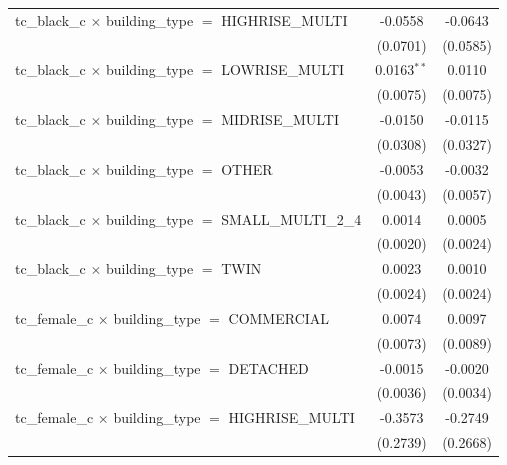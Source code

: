 \begin{tabular}{lcc}
   tc\_black\_c $\times$ building\_type $=$ HIGHRISE\_MULTI            & -0.0558                & -0.0643\\   
                                                                       & (0.0701)               & (0.0585)\\   
   tc\_black\_c $\times$ building\_type $=$ LOWRISE\_MULTI             & 0.0163$^{**}$          & 0.0110\\   
                                                                       & (0.0075)               & (0.0075)\\   
   tc\_black\_c $\times$ building\_type $=$ MIDRISE\_MULTI             & -0.0150                & -0.0115\\   
                                                                       & (0.0308)               & (0.0327)\\   
   tc\_black\_c $\times$ building\_type $=$ OTHER                      & -0.0053                & -0.0032\\   
                                                                       & (0.0043)               & (0.0057)\\   
   tc\_black\_c $\times$ building\_type $=$ SMALL\_MULTI\_2\_4         & 0.0014                 & 0.0005\\   
                                                                       & (0.0020)               & (0.0024)\\   
   tc\_black\_c $\times$ building\_type $=$ TWIN                       & 0.0023                 & 0.0010\\   
                                                                       & (0.0024)               & (0.0024)\\   
   tc\_female\_c $\times$ building\_type $=$ COMMERCIAL                & 0.0074                 & 0.0097\\   
                                                                       & (0.0073)               & (0.0089)\\   
   tc\_female\_c $\times$ building\_type $=$ DETACHED                  & -0.0015                & -0.0020\\   
                                                                       & (0.0036)               & (0.0034)\\   
   tc\_female\_c $\times$ building\_type $=$ HIGHRISE\_MULTI           & -0.3573                & -0.2749\\   
                                                                       & (0.2739)               & (0.2668)\\   

\end{tabular}
